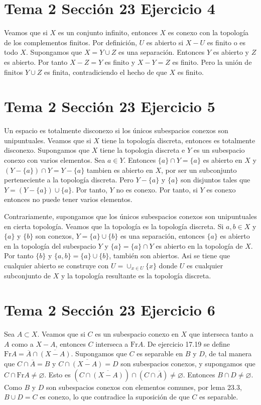 \documentclass{article}
\begin{document}
\section{Tema 2 Sección 23 Ejercicio 4}
Veamos que si $X$ es un conjunto infinito, entonces $X$ es conexo con la topología de los complementos finitos. Por definición, $U$ es abierto si $X-U$ es finito o es todo $X$. Supongamos que $X=Y\cup Z$ es una separación. Entonces $Y$ es abierto y $Z$ es abierto. Por tanto $X-Z=Y$ es finito y $X-Y=Z$ es finito. Pero la unión de finitos $Y\cup Z$ es finita, contradiciendo el hecho de que $X$ es finito.
\section{Tema 2 Sección 23 Ejercicio 5}
Un espacio es totalmente disconexo si los únicos subespacios conexos son unipuntuales. Veamos que si $X$ tiene la topología discreta, entonces es totalmente disconexo. Supongamos que $X$ tiene la topologia discreta e $Y$ es un subespacio conexo con varios elementos. Sea $a\in Y$. Entonces $\{a\}\cap Y=\{a\}$ es abierto en $X$ y $(Y-\{a\})\cap Y=Y-\{a\}$ tambien es abierto en $X$, por ser un subconjunto perteneciente a la topología discreta. Pero $Y-\{a\}$ y $\{a\}$ son disjuntos tales que $Y=(Y-\{a\})\cup\{a\}$. Por tanto, $Y$ no es conexo. Por tanto, si $Y$ es conexo entonces no puede tener varios elementos.

Contrariamente, supongamos que los únicos subespacios conexos son unipuntuales en cierta topología. Veamos que la topología es la topología discreta. Si $a,b\in X$ y $\{a\}$ y $\{b\}$ son conexos, $Y=\{a\}\cup\{b\}$ es una separación, entonces $\{a\}$ es abierto en la topología del subespacio $Y$ y $\{a\}=\{a\}\cap Y$ es abierto en la topología de $X$. Por tanto $\{b\}$ y $\{a,b\}=\{a\}\cup\{b\}$, también son abiertos. Asi se tiene que cualquier abierto se construye con $U=\cup_{x\in U}\{x\}$ donde $U$ es cualquier subconjunto de $X$ y la topología resultante es la topología discreta.

\section{Tema 2 Sección 23 Ejercicio 6}
Sea $A\subset X$. Veamos que si $C$ es un subespacio conexo en $X$ que interseca tanto a $A$ como a $X-A$, entonces $C$ interseca a $\text{Fr} A$. De ejercicio 17.19 se define $\text{Fr} A=\overline{A}\cap \overline{(X-A)}$. Supongamos que $C$ es separable en $B$ y $D$, de tal manera que $C\cap \overline{A}= B$ y $C\cap \overline{(X-A)}=D$ son subespacios conexos, y supongamos que $C\cap \text{Fr}A\neq \varnothing$. Esto es $(C\cap \overline{(X-A)})\cap (C\cap \overline{A})\neq \varnothing$. Entonces $B\cap D\neq \varnothing$. Como $B$ y $D$ son subespacios conexos con elementos comunes, por lema 23.3, $B\cup D=C$ es conexo, lo que contradice la suposición de que $C$ es separable.
\end{document}
